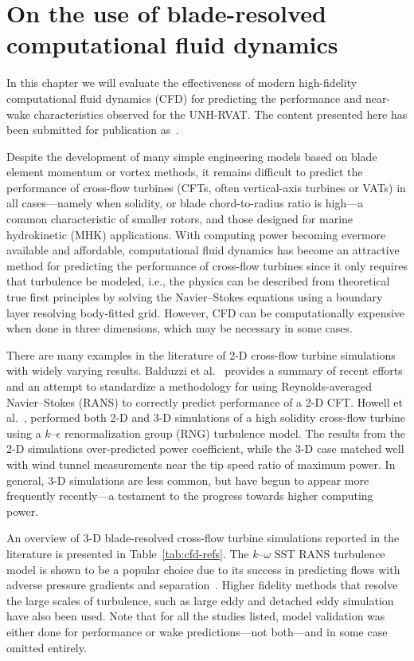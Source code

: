 \chapter{On the use of blade-resolved computational fluid
    dynamics}\label{chap:CFD}

In this chapter we will evaluate the effectiveness of modern high-fidelity
computational fluid dynamics (CFD) for predicting the performance and near-wake
characteristics observed for the UNH-RVAT. The content presented here has been
submitted for publication as~\cite{Bachant2016-BR-CFD}.

Despite the development of many simple engineering models based on blade element
momentum or vortex methods, it remains difficult to predict the performance of
cross-flow turbines (CFTs, often vertical-axis turbines or VATs) in all
cases---namely when solidity, or blade chord-to-radius ratio is high---a common
characteristic of smaller rotors, and those designed for marine hydrokinetic
(MHK) applications. With computing power becoming evermore available and
affordable, computational fluid dynamics has become an attractive method for
predicting the performance of cross-flow turbines since it only requires that
turbulence be modeled, i.e., the physics can be described from theoretical true
first principles by solving the Navier--Stokes equations using a boundary layer
resolving body-fitted grid. However, CFD can be computationally expensive when
done in three dimensions, which may be necessary in some cases.

There are many examples in the literature of 2-D cross-flow turbine simulations
with widely varying results. Balduzzi et al.~\cite{Balduzzi2016} provides
a summary of recent efforts and an attempt to standardize a methodology for
using Reynolds-averaged Navier--Stokes (RANS) to correctly predict performance
of a 2-D CFT. Howell et al.~\cite{Howell2010}, performed both 2-D and 3-D
simulations of a high solidity cross-flow turbine using a $k$--$\epsilon$
renormalization group (RNG) turbulence model. The results from the 2-D
simulations over-predicted power coefficient, while the 3-D case matched well
with wind tunnel measurements near the tip speed ratio of maximum power. In
general, 3-D simulations are less common, but have begun to appear more
frequently recently---a testament to the progress towards higher computing
power.

An overview of 3-D blade-resolved cross-flow turbine simulations reported in the
literature is presented in Table~\ref{tab:cfd-refs}. The $k$--$\omega$ SST RANS
turbulence model is shown to be a popular choice due to its success in
predicting flows with adverse pressure gradients and
separation~\cite{Menter2003}. Higher fidelity methods that resolve the large
scales of turbulence, such as large eddy and detached eddy simulation have also
been used. Note that for all the studies listed, model validation was either
done for performance or wake predictions---not both---and in some case omitted
entirely.

